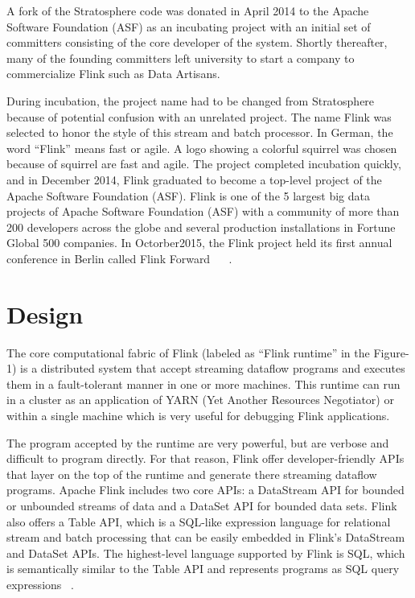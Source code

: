 \documentclass[9pt,twocolumn,twoside]{../../styles/osajnl}
\begin{document}
A fork of the Stratosphere code was donated in April 2014 to the Apache Software Foundation (ASF) as an incubating project with an initial set of committers consisting of the core developer of the system. Shortly thereafter, many of the founding committers left university to start  a company to commercialize Flink such as Data Artisans.

During incubation, the project name had to be changed from Stratosphere because of potential confusion with an unrelated project. The name Flink was selected to honor the style of this stream and batch processor. In German, the word “Flink” means fast or agile. A logo showing a colorful squirrel was chosen because of squirrel are fast and agile. The project completed incubation quickly, and in December 2014, Flink graduated to become a top-level project of the Apache Software Foundation (ASF). Flink is one of the 5 largest big data projects of Apache Software Foundation (ASF) with a community of more than 200 developers across the globe and several production installations in Fortune Global 500 companies.  In Octorber2015, the Flink project held its first annual conference in Berlin called Flink Forward ~\cite{wiki-flink} ~\cite{book-flink}.

\section{Design}
The core computational fabric of Flink  (labeled as “Flink runtime” in the Figure-1) is a distributed system that accept streaming dataflow programs and executes them in a fault-tolerant manner in one or more machines. This runtime can run in a cluster as an application of YARN (Yet Another Resources Negotiator) or within a single machine which is very useful for debugging Flink applications.

The program accepted by the runtime are very powerful, but are verbose and difficult to program directly. For that reason, Flink offer developer-friendly APIs that layer on the top of the runtime and generate there streaming dataflow programs. Apache Flink includes two core APIs: a DataStream API for bounded or unbounded streams of data and a DataSet API for bounded data sets. Flink also offers a Table API, which is a SQL-like expression language for relational stream and batch processing that can be easily embedded in Flink’s DataStream and DataSet APIs. The highest-level language supported by Flink is SQL, which is semantically similar to the Table API and represents programs as SQL query expressions ~\cite{www-flink}.
\end{document}
